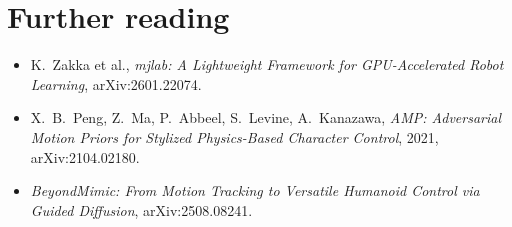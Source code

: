 \section*{Further reading}
\begin{itemize}[nosep]
 \item K.~Zakka et al., \emph{mjlab: A Lightweight Framework for GPU-Accelerated Robot Learning}, arXiv:2601.22074.
 \item X.~B.~Peng, Z.~Ma, P.~Abbeel, S.~Levine, A.~Kanazawa, \emph{AMP: Adversarial Motion Priors for Stylized Physics-Based Character Control}, 2021, arXiv:2104.02180.
 \item \emph{BeyondMimic: From Motion Tracking to Versatile Humanoid Control via Guided Diffusion}, arXiv:2508.08241.
\end{itemize}
